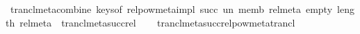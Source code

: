 \begin{isabellebody}
\endisatagproof
{\isafoldproof}%
%
\isadelimproof
\isanewline
%
\endisadelimproof
\isanewline
{}\isamarkupfalse%
\ trancl{\isacharunderscore}{\kern0pt}meta{\isacharunderscore}{\kern0pt}combine{\isacharcolon}{\kern0pt}\ {\isachardoublequoteopen}keys{\isacharunderscore}{\kern0pt}of\ {\isacharparenleft}{\kern0pt}relpow{\isacharunderscore}{\kern0pt}meta{\isacharunderscore}{\kern0pt}impl\ succ\ un\ memb\ rel{\isacharunderscore}{\kern0pt}meta\ empty\ {\isacharparenleft}{\kern0pt}length\ rel{\isacharunderscore}{\kern0pt}meta{\isacharparenright}{\kern0pt}{\isacharparenright}{\kern0pt}\ {\isacharequal}{\kern0pt}\ trancl{\isacharunderscore}{\kern0pt}meta{\isacharunderscore}{\kern0pt}succ{\isachardot}{\kern0pt}rel\isactrlsup {\isacharplus}{\kern0pt}{\isachardoublequoteclose}\isanewline
%
\isadelimproof
\ \ %
\endisadelimproof
%
\isatagproof
{}\isamarkupfalse%
\ trancl{\isacharunderscore}{\kern0pt}meta{\isacharunderscore}{\kern0pt}succ{\isachardot}{\kern0pt}relpow{\isacharunderscore}{\kern0pt}meta{\isacharunderscore}{\kern0pt}trancl\ \isacommand{{\isachardot}{\kern0pt}}\isamarkupfalse%
%
\endisatagproof
{\isafoldproof}%
%
\isadelimproof
\isanewline
%
\endisadelimproof
\isanewline
{}\isamarkupfalse%
\isanewline
%
\isadelimtheory
\isanewline
%
\endisadelimtheory
%
\isatagtheory
{}\isamarkupfalse%
%
\endisatagtheory
{\isafoldtheory}%
%
\isadelimtheory
%
\endisadelimtheory
%
\end{isabellebody}%
\endinput
